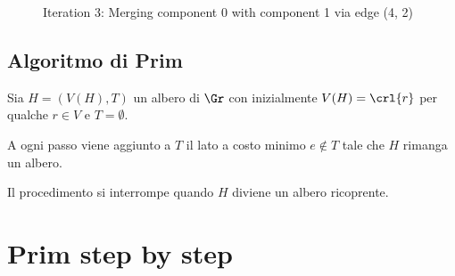 \documentclass[\main/main.tex]{subfiles}
\begin{document}
\begin{figure}
\begin{subfigure}{0.25\textwidth}
  \end{subfigure}
  \caption{Iteration 3: Merging component 0 with component 1 via edge (4, 2)}
\end{figure}

\clearpage
\subsection{Algoritmo di Prim}
Sia \(H = (V(H), T)\) un albero di \(\Gr \) con inizialmente \(V(H) = \crl{r}\) per qualche \(r \in V \) e \(T = \emptyset \).

A ogni passo viene aggiunto a \(T\) il lato a costo minimo \(e \not\in T\) tale che \(H\) rimanga un albero.

Il procedimento si interrompe quando \(H\) diviene un albero ricoprente.

\section{Prim step by step}
\end{document}
